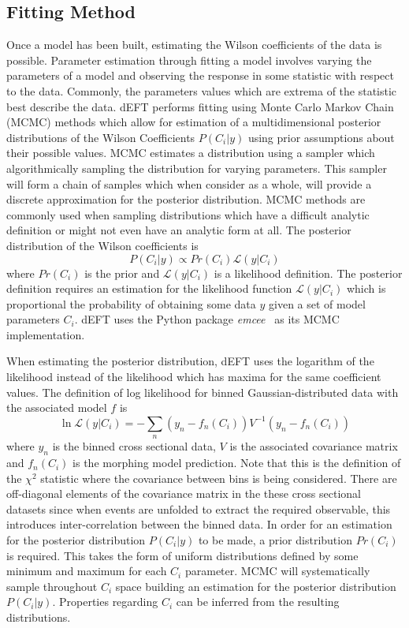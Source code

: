 \documentclass[a4paper,11pt]{article}
\begin{document}
\subsection{Fitting Method}\label{sec:fitting}
Once a model has been built, estimating the Wilson coefficients of the data is possible.
Parameter estimation through fitting a model involves varying the parameters of a model and observing the response in some statistic with respect to the data.
Commonly, the parameters values which are extrema of the statistic best describe the data.
dEFT performs fitting using Monte Carlo Markov Chain (MCMC) methods which allow for estimation of a multidimensional posterior distributions of the Wilson Coefficients $P(C_{i}|y)$ using prior assumptions about their possible values.
MCMC estimates a distribution using a sampler which algorithmically sampling the distribution for varying parameters.
This sampler will form a chain of samples which when consider as a whole, will provide a discrete approximation for the posterior distribution.
MCMC methods are commonly used when sampling distributions which have a difficult analytic definition or might not even have an analytic form at all.
The posterior distribution of the Wilson coefficients is
\begin{equation}
    P(C_{i}|y) \propto Pr(C_{i}) \mathcal{L}(y|C_{i})
\end{equation}
where $Pr(C_{i})$ is the prior and $\mathcal{L}(y|C_{i})$ is a likelihood definition.
The posterior definition requires an estimation for the likelihood function $\mathcal{L}(y | C_{i})$ which is proportional the probability of obtaining some data $y$ given a set of model parameters $C_{i}$.
dEFT uses the Python package \emph{emcee}~\cite{Foreman_Mackey_2013} as its MCMC implementation.

When estimating the posterior distribution, dEFT uses the logarithm of the likelihood instead of the likelihood which has maxima for the same coefficient values.
The definition of log likelihood for binned Gaussian-distributed data with the associated model $f$ is
\begin{equation}\label{eq:likelihood}
    \ln\mathcal{L}(y | C_{i}) = -\sum\limits_{n} (y_{n} - f_{n}(C_{i})) V^{-1} (y_{n} - f_{n}(C_{i}))
\end{equation}
where $y_{n}$ is the binned cross sectional data, $V$ is the associated covariance matrix and $f_{n}(C_{i})$ is the morphing model prediction.
Note that this is the definition of the $\chi^{2}$ statistic where the covariance between bins is being considered.
There are off-diagonal elements of the covariance matrix in the these cross sectional datasets since when events are unfolded to extract the required observable, this introduces inter-correlation between the binned data.
In order for an estimation for the posterior distribution $P(C_{i} | y)$ to be made, a prior distribution $Pr(C_{i})$ is required.
This takes the form of uniform distributions defined by some minimum and maximum for each $C_{i}$ parameter.
MCMC will systematically sample throughout $C_{i}$ space building an estimation for the posterior distribution $P(C_{i}|y)$.
Properties regarding $C_{i}$ can be inferred from the resulting distributions.
\end{document}
